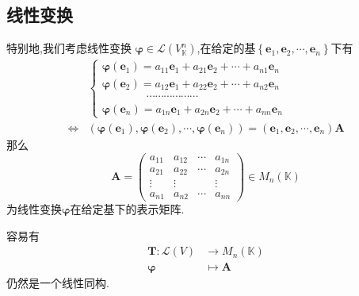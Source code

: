 \subsection{线性变换}
\begin{formal}
\begin{definition}[线性变换的表示矩阵]\label{def:线性变换的表示矩阵}
    特别地,我们考虑线性变换
$\bm{\varphi}\in \mathcal{L}\left(
    V^n_{\mathbb{K}}
\right)$,在给定的基$\left\{
    \bm{e}_1,\bm{e}_2,\cdots,\bm{e}_n
\right\}$下有
\begin{align*}
    &
\begin{cases*}
\bm{\varphi}\left(\bm{e}_1
        \right) = a_{11}\bm{e}_1+
        a_{21}\bm{e}_2
        +\cdots+a_{n1}\bm{e}_n\\
        \bm{\varphi}\left(\bm{e}_2
        \right) = a_{12}\bm{e}_1+a_{22
        }\bm{e}_2
        +\cdots+a_{n2}\bm{e}_n\\
        \qquad\qquad\cdots\cdots\cdots
        \cdots\cdots\cdots\\
        \bm{\varphi}\left(\bm{e}_n
        \right) = a_{1n}\bm{e}_1
        +a_{2n}\bm{e}_2
        +\cdots+a_{nn}\bm{e}_n
\end{cases*}\\
\Longleftrightarrow &
\left(\bm{\varphi}\left(\bm{e}_1\right), \bm{\varphi}\left(\bm{e}_2\right),
\cdots,\bm{\varphi}\left(
    \bm{e}_n
\right)\right)
=
\left(\bm{e}_1,\bm{e}_2,\cdots,\bm{e}_n\right)
\bm{A}
\end{align*}
那么
\[
\bm{A}=\begin{pmatrix}
    a_{11} & a_{12} & \cdots & a_{1n}\\
    a_{21} & a_{22} & \cdots & a_{2n}\\
    \vdots & \vdots &  & \vdots\\
    a_{n1} & a_{n2} & \cdots & a_{nn}
\end{pmatrix}\in M_n\left(
    \mathbb{K}
\right)
\]
为线性变换$\bm{\varphi}$在给定基下的表示矩阵.
\end{definition}
\end{formal}
\begin{formal}
\begin{theorem}[线性变换与表示矩阵]\label{thm:线性变换与表示矩阵}
    容易有
\begin{align*}
    \bm{T}:\mathcal{L}\left(V\right)
    &\longrightarrow M_{n}\left(\mathbb{K}
    \right)
    \\
    \bm{\varphi}&\longmapsto
    \bm{A}
\end{align*}
仍然是一个线性同构.
\end{theorem}
\end{formal}
